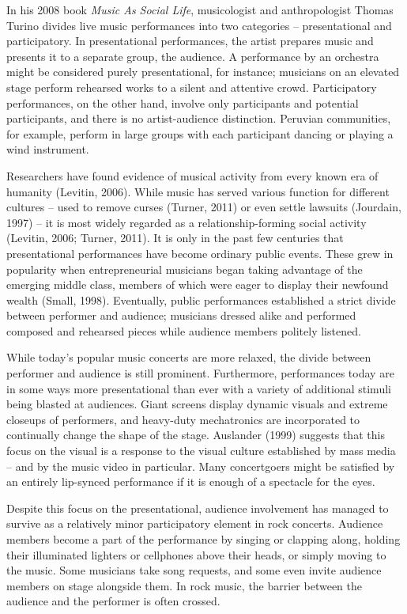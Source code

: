 In his 2008 book \textit{Music As Social Life}, musicologist and anthropologist Thomas Turino divides live music performances into two categories -- presentational and participatory. In presentational performances, the artist prepares music and presents it to a separate group, the audience. A performance by an orchestra might be considered purely presentational, for instance; musicians on an elevated stage perform rehearsed works to a silent and attentive crowd. Participatory performances, on the other hand, involve only participants and potential participants, and there is no artist-audience distinction. Peruvian communities, for example, perform in large groups with each participant dancing or playing a wind instrument.

Researchers have found evidence of musical activity from every known era of humanity (Levitin, 2006). While music has served various function for different cultures -- used to remove curses (Turner, 2011) or even settle lawsuits (Jourdain, 1997) -- it is most widely regarded as a relationship-forming social activity (Levitin, 2006; Turner, 2011). It is only in the past few centuries that presentational performances have become ordinary public events. These grew in popularity when entrepreneurial musicians began taking advantage of the emerging middle class, members of which were eager to display their newfound wealth (Small, 1998). Eventually, public performances established a strict divide between performer and audience; musicians dressed alike and performed composed and rehearsed pieces while audience members politely listened.

While today's popular music concerts are more relaxed, the divide between performer and audience is still prominent. Furthermore, performances today are in some ways more presentational than ever with a variety of additional stimuli being blasted at audiences. Giant screens display dynamic visuals and extreme closeups of performers, and heavy-duty mechatronics are incorporated to continually change the shape of the stage. Auslander (1999) suggests that this focus on the visual is a response to the visual culture established by mass media -- and by the music video in particular. Many concertgoers might be satisfied by an entirely lip-synced performance if it is enough of a spectacle for the eyes.

Despite this focus on the presentational, audience involvement has managed to survive as a relatively minor participatory element in rock concerts. Audience members become a part of the performance by singing or clapping along, holding their illuminated lighters or cellphones above their heads, or simply moving to the music. Some musicians take song requests, and some even invite audience members on stage alongside them. In rock music, the barrier between the audience and the performer is often crossed.

